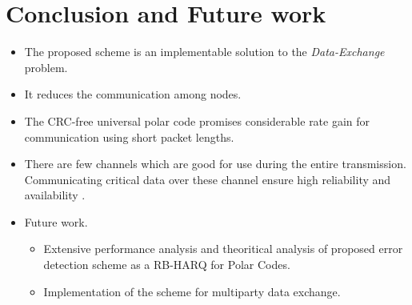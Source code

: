 \documentclass[
11pt, %
a4paper, %
oneside, %
headinclude,footinclude, %
BCOR5mm, %
]{scrartcl}
\begin{document}
\section{Conclusion and Future work}\label{future}
\begin{itemize}
\item The proposed scheme is an implementable solution to the \emph{Data-Exchange} problem.
\item It reduces the communication among nodes.
\item The CRC-free universal polar code promises considerable rate gain for communication using short packet lengths. 
\item There are few channels which are good for use during the entire transmission. Communicating critical data over these channel ensure high reliability and availability . 
\end{itemize}
\begin{itemize}
\item Future work.
\begin{itemize}
\item Extensive performance analysis and theoritical analysis of proposed error detection scheme as a RB-HARQ for Polar Codes.
\item Implementation of the scheme for multiparty data exchange.
\end{itemize}
\end{itemize}




\clearpage




\end{document}
